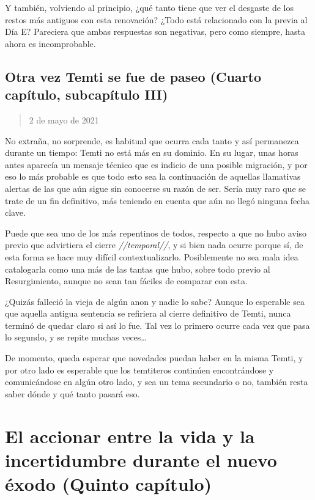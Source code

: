 \documentclass[
  spanish,
]{book}
\begin{document}
Y también, volviendo al principio, ¿qué tanto tiene que ver el desgaste de los restos más antiguos con esta renovación? ¿Todo está relacionado con la previa al Día E?
Pareciera que ambas respuestas son negativas, pero como siempre, hasta ahora es incomprobable.

\hypertarget{otra-vez-temti-se-fue-de-paseo-cuarto-capuxedtulo-subcapuxedtulo-iii}{%
\section{Otra vez Temti se fue de paseo (Cuarto capítulo, subcapítulo III)}\label{otra-vez-temti-se-fue-de-paseo-cuarto-capuxedtulo-subcapuxedtulo-iii}}

\begin{quote}
2 de mayo de 2021
\end{quote}

No extraña, no sorprende, es habitual que ocurra cada tanto y así permanezca durante un tiempo: Temti no está más en su dominio. En su lugar, unas horas antes aparecía un mensaje técnico que es indicio de una posible migración, y por eso lo más probable es que todo esto sea la continuación de aquellas llamativas alertas de las que aún sigue sin conocerse su razón de ser. Sería muy raro que se trate de un fin definitivo, más teniendo en cuenta que aún no llegó ninguna fecha clave.

Puede que sea uno de los más repentinos de todos, respecto a que no hubo aviso previo que advirtiera el cierre \emph{//temporal//}, y si bien nada ocurre porque sí, de esta forma se hace muy difícil contextualizarlo. Posiblemente no sea mala idea catalogarla como una más de las tantas que hubo, sobre todo previo al Resurgimiento, aunque no sean tan fáciles de comparar con esta.

¿Quizás falleció la vieja de algún anon y nadie lo sabe? Aunque lo esperable sea que aquella antigua sentencia se refiriera al cierre definitivo de Temti, nunca terminó de quedar claro si así lo fue. Tal vez lo primero ocurre cada vez que pasa lo segundo, y se repite muchas veces\ldots{}

De momento, queda esperar que novedades puedan haber en la misma Temti, y por otro lado es esperable que los temtiteros continúen encontrándose y comunicándose en algún otro lado, y sea un tema secundario o no, también resta saber dónde y qué tanto pasará eso.

\hypertarget{el-accionar-entre-la-vida-y-la-incertidumbre-durante-el-nuevo-uxe9xodo-quinto-capuxedtulo}{%
\chapter{El accionar entre la vida y la incertidumbre durante el nuevo éxodo (Quinto capítulo)}\label{el-accionar-entre-la-vida-y-la-incertidumbre-durante-el-nuevo-uxe9xodo-quinto-capuxedtulo}}
\end{document}
